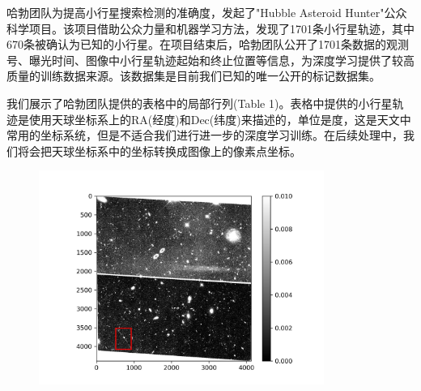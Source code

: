\documentclass[12pt,a4paper]{article}%
\begin{document}
哈勃团队为提高小行星搜索检测的准确度，发起了"Hubble Asteroid Hunter"公众科学项目。该项目借助公众力量和机器学习方法，发现了1701条小行星轨迹，其中670条被确认为已知的小行星。在项目结束后，哈勃团队公开了1701条数据的观测号、曝光时间、图像中小行星轨迹起始和终止位置等信息，为深度学习提供了较高质量的训练数据来源。该数据集是目前我们已知的唯一公开的标记数据集。

我们展示了哈勃团队提供的表格中的局部行列(Table 1)。表格中提供的小行星轨迹是使用天球坐标系上的RA(经度)和Dec(纬度)来描述的，单位是度，这是天文中常用的坐标系统，但是不适合我们进行进一步的深度学习训练。在后续处理中，我们将会把天球坐标系中的坐标转换成图像上的像素点坐标。

\begin{figure}[H]%
    \centering
    \begin{minipage}{0.48\textwidth}
        \centering
        \includegraphics[width=0.83\textwidth]{fig71.jpg}


\end{minipage}
\end{figure}
\end{document}
